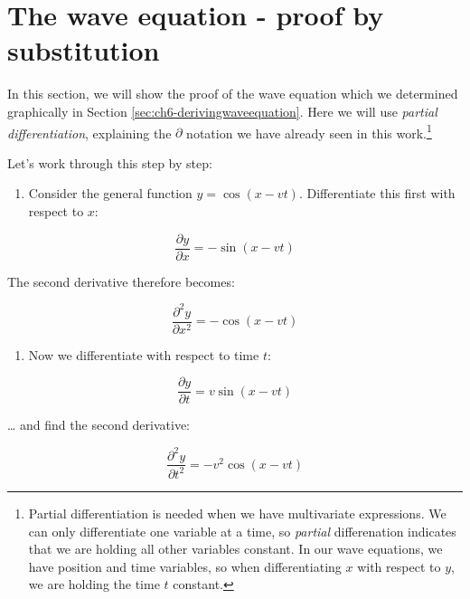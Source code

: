 \documentclass[
]{book}
\providecommand{\tightlist}{%
  \setlength{\itemsep}{0pt}\setlength{\parskip}{0pt}}
\begin{document}
\hypertarget{sec:ch6-waveequationproof2}{%
\section{The wave equation - proof by substitution}\label{sec:ch6-waveequationproof2}}

In this section, we will show the proof of the wave equation which we determined graphically in Section \ref{sec:ch6-derivingwaveequation}. Here we will use \emph{partial differentiation}, explaining the \(\partial\) notation we have already seen in this work.\footnote{Partial differentiation is needed when we have multivariate expressions. We can only differentiate one variable at a time, so \emph{partial} differenation indicates that we are holding all other variables constant. In our wave equations, we have position and time variables, so when differentiating \(x\) with respect to \(y\), we are holding the time \(t\) constant.}

Let's work through this step by step:

\begin{enumerate}
\def\labelenumi{\arabic{enumi}.}
\tightlist
\item
  Consider the general function \(y = \cos(x - vt)\). Differentiate this first with respect to \(x\):
\end{enumerate}

\begin{equation}
\frac{\partial y}{\partial x} = -\sin(x - vt)
\end{equation}

The second derivative therefore becomes:

\begin{equation}
\frac{\partial^2 y}{\partial x^2} = -\cos(x - vt)
\label{eq:ch6-wavederivsubs1}
\end{equation}

\begin{enumerate}
\def\labelenumi{\arabic{enumi}.}
\setcounter{enumi}{1}
\tightlist
\item
  Now we differentiate with respect to time \(t\):
\end{enumerate}

\begin{equation}
\frac{\partial y}{\partial t} = v\sin(x - vt)
\end{equation}

\ldots{} and find the second derivative:

\begin{equation}
\frac{\partial^2 y}{\partial t^2} = -v^2 \cos(x - vt)
\label{eq:ch6-wavederivsubs2}
\end{equation}
\end{document}
